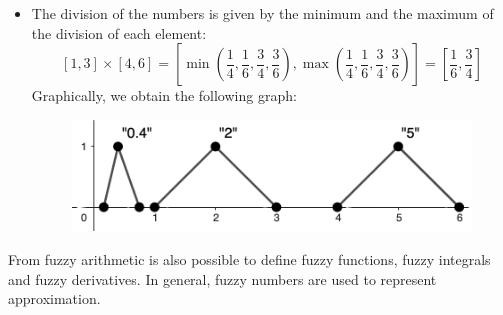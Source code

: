 \documentclass[12pt, a4paper]{report}
\begin{document}
\begin{example}
\begin{itemize}
            \item The division of the numbers is given by the minimum and the maximum of the division of each element:
            \[[1,3] \times [4,6]=[\min(\frac{1}{4}, \frac{1}{6}, \frac{3}{4}, \frac{3}{6}),\max(\frac{1}{4}, \frac{1}{6}, \frac{3}{4}, \frac{3}{6})]=[\frac{1}{6},\frac{3}{4}]\]
                Graphically, we obtain the following graph:
                \begin{figure}[H]
                    \centering
                    \includegraphics[width=0.5\linewidth]{images/division.png}
                \end{figure}
        \end{itemize}
    \end{example}
    
    From fuzzy arithmetic is also possible to define fuzzy functions, fuzzy integrals and fuzzy derivatives. In general, fuzzy numbers are used 
    to represent approximation.
\end{document}
